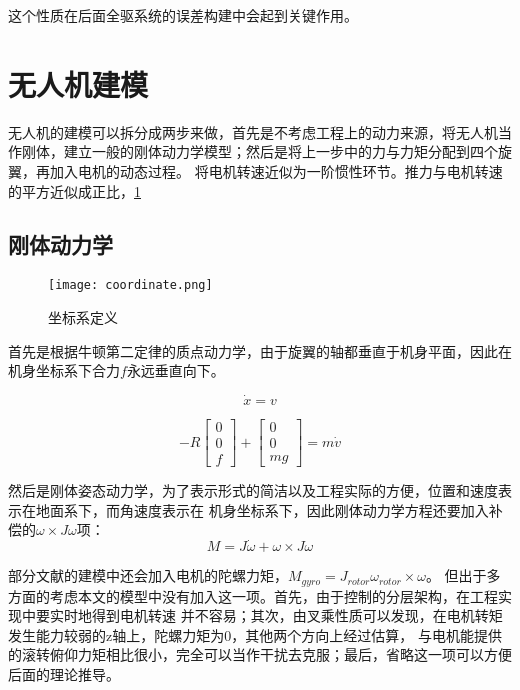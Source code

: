 这个性质在后面全驱系统的误差构建中会起到关键作用。
  \section{无人机建模}
  无人机的建模可以拆分成两步来做，首先是不考虑工程上的动力来源，将无人机当作刚体，建立一般的刚体动力学模型；然后是将上一步中的力与力矩分配到四个旋翼，再加入电机的动态过程。
  将电机转速近似为一阶惯性环节。推力与电机转速的平方近似成正比，\ref{fig:1}
    \subsection{刚体动力学}
    \begin{figure}[!h]
      \centering
      \texttt{[image: coordinate.png]}
      \caption{坐标系定义}
      \label{fig:1}
    \end{figure}
    首先是根据牛顿第二定律的质点动力学，由于旋翼的轴都垂直于机身平面，因此在机身坐标系下合力$f$永远垂直向下。

  \begin{equation}
    \dot x=v
  \end{equation}

  \begin{equation}
    -R \begin{bmatrix} 0\\ 0\\ f \end{bmatrix}+\begin{bmatrix} 0\\ 0\\ mg\end{bmatrix}=m \dot v 
    \label{equ:a}
  \end{equation}

    然后是刚体姿态动力学，为了表示形式的简洁以及工程实际的方便，位置和速度表示在地面系下，而角速度表示在
    机身坐标系下，因此刚体动力学方程还要加入补偿的$\omega \times J \omega$项：
  \begin{equation}
    M=J \dot\omega +\omega \times J \omega
    \label{equ:M}
  \end{equation}

    部分文献的建模中还会加入电机的陀螺力矩\cite{quanbook}，$M_{gyro}=J_{rotor} \omega_{rotor} \times \omega$。 
    但出于多方面的考虑本文的模型中没有加入这一项。首先，由于控制的分层架构，在工程实现中要实时地得到电机转速  并不容易；其次，由叉乘性质可以发现，在电机转矩发生能力较弱的z轴上，陀螺力矩为$0$，其他两个方向上经过估算，
    与电机能提供的滚转俯仰力矩相比很小，完全可以当作干扰去克服；最后，省略这一项可以方便后面的理论推导。

